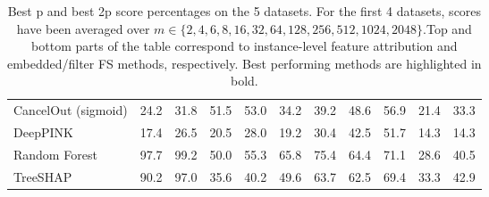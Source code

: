 \begin{table}[h!]
{{\begin{tabular}{lrrrrrrrrrr}
CancelOut (sigmoid) & 24.2 & 31.8 & 51.5 & 53.0 & 34.2 & 39.2 & 48.6 & 56.9 & 21.4 & 33.3 \\
DeepPINK & 17.4 & 26.5 & 20.5 & 28.0 & 19.2 & 30.4 & 42.5 & 51.7 & 14.3 & 14.3 \\
Random Forest & 97.7 & 99.2 & 50.0 & 55.3 & 65.8 & 75.4 & 64.4 & 71.1 & 28.6 & 40.5 \\
TreeSHAP & 90.2 & 97.0 & 35.6 & 40.2 & 49.6 & 63.7 & 62.5 & 69.4 & 33.3 & 42.9 \\
\bottomrule
\end{tabular}}}{}
\caption{Best p and best 2p score percentages on the 5 datasets. For the first 4 datasets, scores have been averaged over $m \in \{2, 4, 6, 8, 16, 32, 64, 128, 256, 512, 1024, 2048\}$.Top and bottom parts of the table correspond to instance-level feature attribution and embedded/filter FS methods, respectively. Best performing methods are highlighted in bold.}
\end{table}
